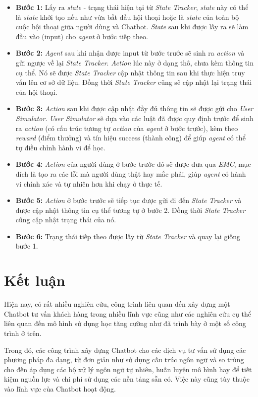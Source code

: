 \begin{itemize}
    \item \textbf{Bước 1:} Lấy ra \textit{state} - trạng thái hiện tại từ \textit{State Tracker}, \textit{state} này có thể là \textit{state} khởi tạo nếu như vừa bắt đầu hội thoại hoặc là \textit{state} của toàn bộ cuộc hội thoại giữa người dùng và Chatbot. \textit{State} sau khi được lấy ra sẽ làm đầu vào (input) cho \textit{agent} ở bước tiếp theo.
    \item \textbf{Bước 2:} \textit{Agent} sau khi nhận được input từ bước trước sẽ sinh ra \textit{action} và gửi ngược về lại \textit{State Tracker}. \textit{Action} lúc này ở dạng thô, chưa kèm thông tin cụ thể. Nó sẽ được \textit{State Tracker} cập nhật thông tin sau khi thực hiện truy vấn lên cơ sở dữ liệu. Đồng thời \textit{State Tracker} cũng sẽ cập nhật lại trạng thái của hội thoại.
    \item \textbf{Bước 3:} \textit{Action} sau khi được cập nhật đầy đủ thông tin sẽ được gửi cho \textit{User Simulator}. \textit{User Simulator} sẽ dựa vào các luật đã được quy định trước để sinh ra \textit{action} (có cấu trúc tương tự \textit{action} của \textit{agent} ở bước trước), kèm theo \textit{reward} (điểm thưởng) và tín hiệu success (thành công) để giúp \textit{agent} có thể tự điều chỉnh hành vi để học.
    \item \textbf{Bước 4:} \textit{Action} của người dùng ở bước trước đó sẽ được đưa qua \textit{EMC}, mục đích là tạo ra các lỗi mà người dùng thật hay mắc phải, giúp \textit{agent} có hành vi chính xác và tự nhiên hơn khi chạy ở thực tế.
    \item \textbf{Bước 5:} \textit{Action} ở bước trước sẽ tiếp tục được gửi đi đến \textit{State Tracker} và được cập nhật thông tin cụ thể tương tự ở bước 2. Đồng thời \textit{State Tracker} cũng cập nhật trạng thái của nó.
    \item \textbf{Bước 6:} Trạng thái tiếp theo được lấy từ \textit{State Tracker} và quay lại giống bước 1.
\end{itemize}

\section{Kết luận}
Hiện nay, có rất nhiều nghiên cứu, công trình liên quan đến xây dựng một Chatbot tư vấn khách hàng trong nhiều lĩnh vực cũng như các nghiên cứu cụ thể liên quan đến mô hình sử dụng học tăng cường như đã trình bày ở một số công trình ở trên.

Trong đó, các công trình xây dựng Chatbot cho các dịch vụ tư vấn sử dụng các phương pháp đa dạng, từ đơn giản như sử dụng cấu trúc ngôn ngữ và so trùng cho đến áp dụng các bộ xử lý ngôn ngữ tự nhiên, huấn luyện mô hình hay để tiết kiệm nguồn lực và chi phí sử dụng các nền tảng sẵn có. Việc này cũng tùy thuộc vào lĩnh vực của Chatbot hoạt động.

